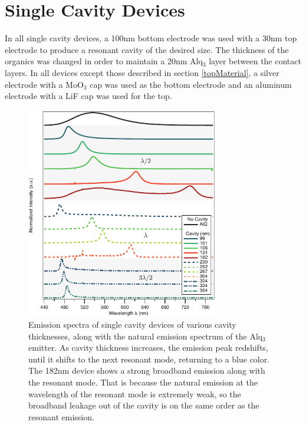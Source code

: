 \documentclass{report}
\begin{document}
    \section{Single Cavity Devices} \label{n=1}

        In all single cavity devices, a 100nm bottom electrode was used with a 30nm top electrode to produce a resonant cavity of the desired size. The thickness of the organics was changed in order to maintain a 20nm Alq$_3$ layer between the contact layers. In all devices except those described in section \ref{topMaterial}, a silver electrode with a MoO$_3$ cap was used as the bottom electrode and an aluminum electrode with a LiF cap was used for the top.
    
        \begin{figure}[h!]%
            \centering
            \includegraphics[width=0.75\textwidth]{images/n1_spectra.png}
            \caption{Emission spectra of single cavity devices of various cavity thicknesses, along with the natural emission spectrum of the Alq$_3$ emitter. As cavity thickness increases, the emission peak redshifts, until it shifts to the next resonant mode, returning to a blue color. The 182nm device shows a strong broadband emission along with the resonant mode. That is because the natural emission at the wavelength of the resonant mode is extremely weak, so the broadband leakage out of the cavity is on the same order as the resonant emission.}
            \label{fig:n1_spectra}
        \end{figure}
        
\end{document}
